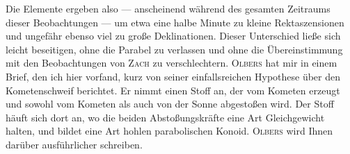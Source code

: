 \par\indent Die Elemente ergeben also --- anscheinend während des gesamten Zeitraums dieser Beobachtungen --- um etwa eine halbe Minute zu kleine Rektaszensionen und ungefähr ebenso viel zu große Deklinationen. Dieser Unterschied ließe sich leicht beseitigen, ohne die Parabel zu verlassen und ohne die Übereinstimmung mit den Beobachtungen von \textsc{Zach} zu verschlechtern. \textsc{Olbers} hat mir in einem Brief, den ich hier vorfand, kurz von seiner einfallsreichen Hypothese über den Kometenschweif berichtet. Er nimmt einen Stoff an, der vom Kometen erzeugt und sowohl vom Kometen als auch von der Sonne abgestoßen wird. Der Stoff häuft sich dort an, wo die beiden Abstoßungskräfte eine Art Gleichgewicht halten, und bildet eine Art hohlen parabolischen Konoid. \textsc{Olbers} wird Ihnen darüber ausführlicher schreiben.
